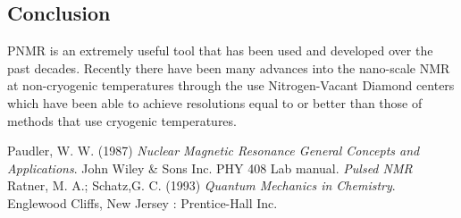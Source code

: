 \documentclass{article}
\begin{document}
{\begin{multicols}{2}
\section{Conclusion}
PNMR is an extremely useful tool that has been used and developed over the past decades. Recently there have been many advances into the nano-scale NMR at non-cryogenic temperatures through the use Nitrogen-Vacant Diamond centers which have been able to achieve resolutions equal to or better than those of methods that use cryogenic temperatures.
\begin{thebibliography}{9}
Paudler, W. W. (1987) \emph{Nuclear Magnetic Resonance General 
Concepts and Applications}. John Wiley \& Sons Inc.
PHY 408 Lab manual. \emph{Pulsed NMR}
Ratner, M. A.; Schatz,G. C. (1993) \emph{Quantum Mechanics in Chemistry}. 
Englewood Cliffs, New Jersey : Prentice-Hall Inc.
\end{thebibliography}
\end{multicols}
}
\end{document}
